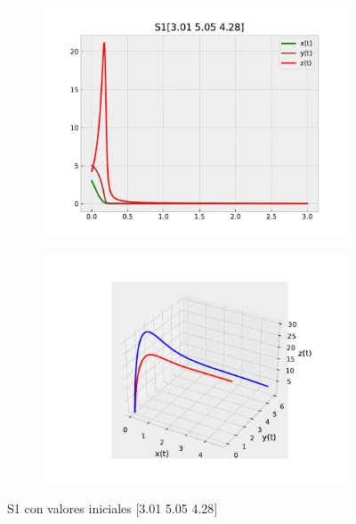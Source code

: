 \documentclass{wscpaperproc}
\theoremstyle{wsc}
\begin{document}
\begin{figure}[h]
	\centering
	\begin{subfigure}[b]{0.5\textwidth}
		\centering
		\includegraphics[width=\textwidth]{Simulations/S1[3.01 5.05 4.28].pdf}
		\label{fig:grafica1}
	\end{subfigure}%
	\begin{subfigure}[b]{0.5\textwidth}
		\centering
		\includegraphics[width=\textwidth]{Simulations/S13d.pdf}
		\label{fig:grafica12}
	\end{subfigure}
	\caption{S1 con valores iniciales [3.01 5.05 4.28]}
	\label{fig:comparacion1}
\end{figure}
\end{document}
